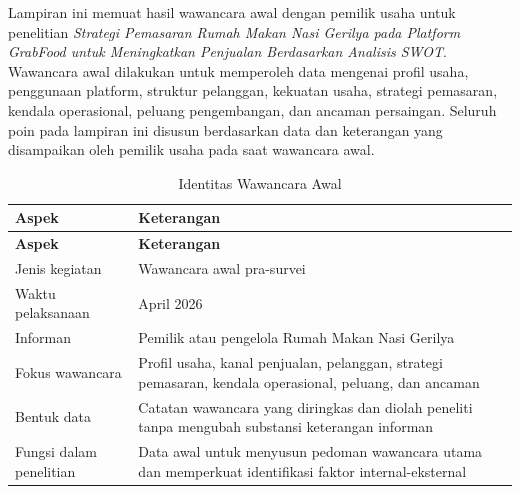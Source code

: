 \label{app:wawancara-awal-pemilik}

Lampiran ini memuat hasil wawancara awal dengan pemilik usaha untuk penelitian \textit{Strategi Pemasaran Rumah Makan Nasi Gerilya pada Platform GrabFood untuk Meningkatkan Penjualan Berdasarkan Analisis SWOT}. Wawancara awal dilakukan untuk memperoleh data mengenai profil usaha, penggunaan platform, struktur pelanggan, kekuatan usaha, strategi pemasaran, kendala operasional, peluang pengembangan, dan ancaman persaingan. Seluruh poin pada lampiran ini disusun berdasarkan data dan keterangan yang disampaikan oleh pemilik usaha pada saat wawancara awal.

\begingroup
\begin{xltabular}{\textwidth}{|Z{3.4cm}|Y|}
\caption{Identitas Wawancara Awal}
\label{tab:identitas_wawancara_awal} \\
        \toprule
        \textbf{Aspek}             & \textbf{Keterangan}                                                                                       \\ \hline
        \midrule
\endfirsthead
{}
        \toprule
        \textbf{Aspek}             & \textbf{Keterangan}                                                                                       \\ \hline
        \midrule
\endhead
{}
\endfoot
        \bottomrule
        \endlastfoot
        Jenis kegiatan             & Wawancara awal pra-survei                                                                                 \\ \hline
        Waktu pelaksanaan          & April 2026                                                                                                \\ \hline
        Informan                   & Pemilik atau pengelola Rumah Makan Nasi Gerilya                                                           \\ \hline
        Fokus wawancara            & Profil usaha, kanal penjualan, pelanggan, strategi pemasaran, kendala operasional, peluang, dan ancaman   \\ \hline
        Bentuk data                & Catatan wawancara yang diringkas dan diolah peneliti tanpa mengubah substansi keterangan informan         \\ \hline
        Fungsi dalam penelitian    & Data awal untuk menyusun pedoman wawancara utama dan memperkuat identifikasi faktor internal-eksternal    \\ \hline
        \bottomrule
    
\end{xltabular}
\endgroup

